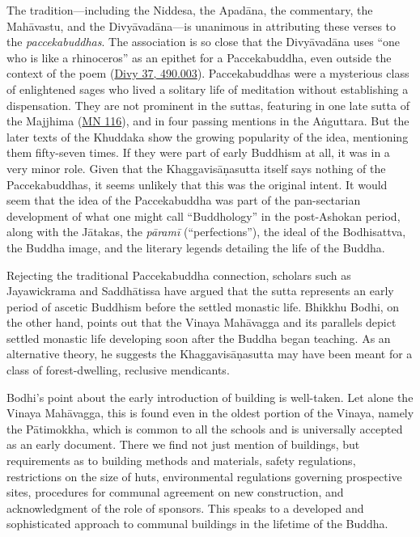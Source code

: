 \documentclass[12pt,openany]{book}%
\begin{document}
The tradition—including the Niddesa, the \textsanskrit{Apadāna}, the commentary, the \textsanskrit{Mahāvastu}, and the \textsanskrit{Divyāvadāna}—is unanimous in attributing these verses to the \textit{paccekabuddhas}. The association is so close that the \textsanskrit{Divyāvadāna} uses “one who is like a rhinoceros” as an epithet for a Paccekabuddha, even outside the context of the poem (\href{https://suttacentral.net/divy37/san/vaidya\#vai490.003}{Divy 37, 490.003}). Paccekabuddhas were a mysterious class of enlightened sages who lived a solitary life of meditation without establishing a dispensation. They are not prominent in the suttas, featuring in one late sutta of the Majjhima (\href{https://suttacentral.net/mn116/en/sujato}{MN 116}), and in four passing mentions in the \textsanskrit{Aṅguttara}. But the later texts of the Khuddaka show the growing popularity of the idea, mentioning them fifty-seven times. If they were part of early Buddhism at all, it was in a very minor role. Given that the \textsanskrit{Khaggavisāṇasutta} itself says nothing of the Paccekabuddhas, it seems unlikely that this was the original intent. It would seem that the idea of the Paccekabuddha was part of the pan-sectarian development of what one might call “Buddhology” in the post-Ashokan period, along with the \textsanskrit{Jātakas}, the \textit{\textsanskrit{pāramī}} (“perfections”), the ideal of the Bodhisattva, the Buddha image, and the literary legends detailing the life of the Buddha.

Rejecting the traditional Paccekabuddha connection, scholars such as Jayawickrama and \textsanskrit{Saddhātissa} have argued that the sutta represents an early period of ascetic Buddhism before the settled monastic life. Bhikkhu Bodhi, on the other hand, points out that the Vinaya \textsanskrit{Mahāvagga} and its parallels depict settled monastic life developing soon after the Buddha began teaching. As an alternative theory, he suggests the \textsanskrit{Khaggavisāṇasutta} may have been meant for a class of forest-dwelling, reclusive mendicants.

Bodhi’s point about the early introduction of building is well-taken. Let alone the Vinaya \textsanskrit{Mahāvagga}, this is found even in the oldest portion of the Vinaya, namely the \textsanskrit{Pātimokkha}, which is common to all the schools and is universally accepted as an early document. There we find not just mention of buildings, but requirements as to building methods and materials, safety regulations, restrictions on the size of huts, environmental regulations governing prospective sites, procedures for communal agreement on new construction, and acknowledgment of the role of sponsors. This speaks to a developed and sophisticated approach to communal buildings in the lifetime of the Buddha.
\end{document}
